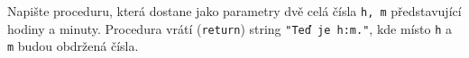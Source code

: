 \question[50]
Napište proceduru, která dostane jako parametry dvě celá čísla \texttt{h, m}
představující hodiny a minuty. Procedura vrátí (\texttt{return}) string
\texttt{"Teď je h:m."}, kde místo \texttt{h} a \texttt{m} budou obdržená čísla.
